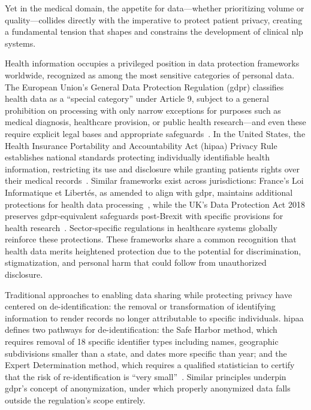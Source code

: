 Yet in the medical domain, the appetite for data---whether prioritizing volume or quality---collides directly with the imperative to protect patient privacy, creating a fundamental tension that shapes and constrains the development of clinical \gls{nlp} systems.

Health information occupies a privileged position in data protection frameworks worldwide, recognized as among the most sensitive categories of personal data. The European Union's General Data Protection Regulation (\gls{gdpr}) classifies health data as a ``special category'' under Article 9, subject to a general prohibition on processing with only narrow exceptions for purposes such as medical diagnosis, healthcare provision, or public health research---and even these require explicit legal bases and appropriate safeguards~\citep{gdpr2016}. In the United States, the Health Insurance Portability and Accountability Act (\gls{hipaa}) Privacy Rule establishes national standards protecting individually identifiable health information, restricting its use and disclosure while granting patients rights over their medical records~\citep{hipaa1996}. Similar frameworks exist across jurisdictions: France's Loi Informatique et Libertés, as amended to align with \gls{gdpr}, maintains additional protections for health data processing~\citep{cnil2018loi}, while the UK's Data Protection Act 2018 preserves \gls{gdpr}-equivalent safeguards post-Brexit with specific provisions for health research~\citep{ukdpa2018}. Sector-specific regulations in healthcare systems globally reinforce these protections. These frameworks share a common recognition that health data merits heightened protection due to the potential for discrimination, stigmatization, and personal harm that could follow from unauthorized disclosure.

Traditional approaches to enabling data sharing while protecting privacy have centered on de-identification: the removal or transformation of identifying information to render records no longer attributable to specific individuals. \gls{hipaa} defines two pathways for de-identification: the Safe Harbor method, which requires removal of 18 specific identifier types including names, geographic subdivisions smaller than a state, and dates more specific than year; and the Expert Determination method, which requires a qualified statistician to certify that the risk of re-identification is ``very small''~\citep{hipaa1996}. Similar principles underpin \gls{gdpr}'s concept of anonymization, under which properly anonymized data falls outside the regulation's scope entirely.


